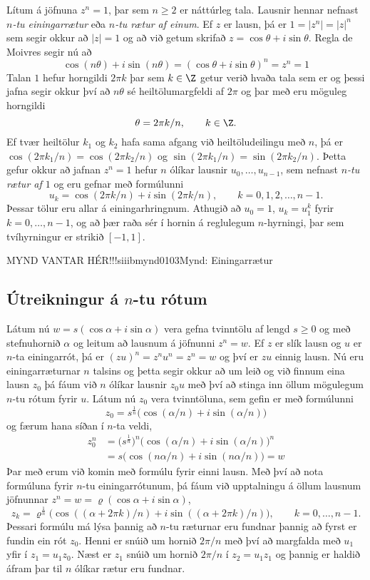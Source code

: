 Lítum á jöfnuna $z^n=1$, þar sem $n\geq 2$ er náttúrleg tala.
Lausnir hennar nefnast {\it $n$-tu einingarrætur} eða {\it $n$-tu
rætur af einum}. 
Ef $z$ er lausn, þá er $1=|z^n|=|z|^n$ sem segir okkur
að $|z|=1$ og að við getum skrifað $z=\cos \theta+i\sin \theta$.
Regla de Moivres segir nú að 
$$
\cos (n\theta)+i\sin(n\theta)=(\cos \theta+i\sin \theta)^n=z^n=1
$$
Talan $1$ hefur horngildi $2\pi k$ þar sem  $k\in \Z$ getur verið
hvaða tala sem er 
og þessi jafna segir okkur því að 
$n\theta$ sé heiltölumargfeldi af $2\pi$ og þar með eru möguleg
horngildi
$$
\theta=2\pi k/n, \qquad k\in \Z.
$$
Ef tvær heiltölur $k_1$ og $k_2$ hafa sama afgang við heiltöludeilingu
með $n$, þá er $\cos(2\pi k_1/n)=\cos(2\pi k_2/n)$
og $\sin(2\pi k_1/n)=\sin(2\pi k_2/n)$.  Þetta gefur okkur að 
jafnan $z^n=1$ hefur $n$ ólíkar lausnir $u_0,\dots,u_{n-1}$, 
sem nefnast {\it $n$-tu rætur af $1$} og eru gefnar með formúlunni
$$
u_k=\cos(2\pi k/n)+i\sin(2\pi k/n), \qquad k=0,1,2,\dots,n-1.
$$
Þessar tölur eru allar á einingarhringnum.  Athugið 
að $u_0=1$,  $u_k=u_1^k$ fyrir $k=0,\dots,n-1$,  og að 
þær raða sér í hornin á reglulegum $n$-hyrningi, þar sem tvíhyrningur 
er strikið $[-1,1]$.
\begin{center}
MYND VANTAR HÉR!!!{siiibmynd0103}{Mynd: Einingarrætur}
\end{center}


\subsection*{Útreikningur á $n$-tu rótum}

Látum nú $w=s(\cos\alpha+i\sin \alpha)$ vera gefna tvinntölu
af lengd $s\geq 0$ og með stefnuhornið $\alpha$
og leitum að lausnum á jöfnunni $z^n=w$.  Ef $z$ er slík lausn
og $u$ er $n$-ta einingarrót, þá er $(zu)^n=z^nu^n=z^n=w$ og því er 
$zu$ einnig lausn.  Nú eru einingarræturnar $n$ talsins og þetta segir
okkur að um leið og við finnum eina lausn $z_0$ þá fáum við $n$ ólíkar
lausnir $z_0u$ með því að stinga inn öllum mögulegum $n$-tu rótum
fyrir $u$.  
Látum nú $z_0$ vera tvinntöluna, sem gefin er með formúlunni
$$
z_0=s^{\frac 1n}\big(\cos(\alpha/n)+i\sin(\alpha/n)\big)
$$ 
og færum hana síðan í $n$-ta veldi,
\begin{align*}
z_0^n &=\big(s^{\frac 1n}\big)^n\big(\cos(\alpha/n)+i\sin(\alpha/n)\big)^n \\
 & =s\big(\cos(n\alpha/n)+i\sin(n\alpha/n)\big)=w
\end{align*}
Þar með erum við komin með formúlu fyrir einni  lausn. 
Með því að nota formúluna fyrir $n$-tu einingarrótunum, þá
fáum við upptalningu á öllum lausnum jöfnunnar
$z^n=w=\varrho(\cos\alpha+i\sin \alpha)$,
$$
z_k=\varrho^{\frac 1n}\big(\cos((\alpha+2\pi k)/n)+i\sin((\alpha+2\pi
k)/n)\big), \qquad k=0,\dots,n-1.
$$
Þessari formúlu má lýsa þannig að $n$-tu ræturnar eru fundnar þannig að
fyrst er fundin ein rót $z_0$.  Henni er snúið um hornið $2\pi/n$ 
með því að  margfalda með 
$u_1$ yfir í $z_1=u_1z_0$.  Næst er $z_1$ snúið um hornið $2\pi/n$
í $z_2=u_1z_1$ og þannig er haldið áfram þar til $n$ ólíkar rætur eru
fundnar.


